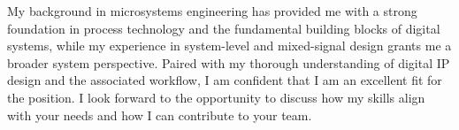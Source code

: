 


My background in microsystems engineering has provided me with a strong foundation in process technology and the fundamental building blocks of digital systems, while my experience in system-level and mixed-signal design grants me a broader system perspective. Paired with my thorough understanding of digital IP design and the associated workflow, I am confident that I am an excellent fit for the \stelleText{} position. I look forward to the opportunity to discuss how my skills align with your needs and how I can contribute to your team. 













